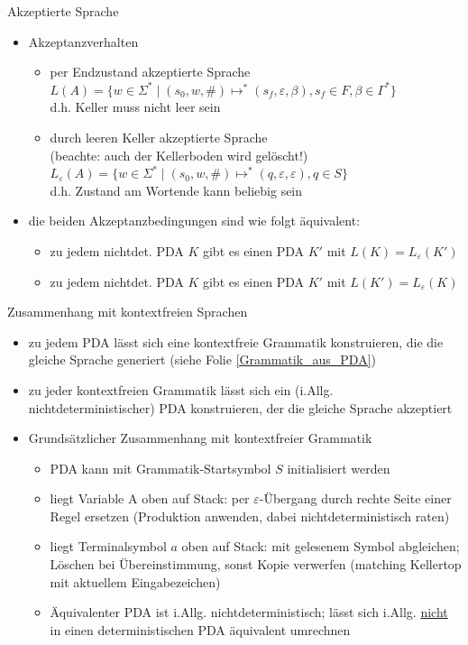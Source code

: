 \begin{frame}{Akzeptierte Sprache}
	\begin{itemize}
		\item Akzeptanzverhalten
		\begin{itemize}
			\item per Endzustand akzeptierte Sprache\\
			$L(A)=\{w \in \Sigma^* \mid (s_0, w, \#) \mapsto^* (s_f, \varepsilon, \beta), s_f \in F, \beta \in \Gamma^*\}$\\
			d.h. Keller muss nicht leer sein
			\item durch leeren Keller akzeptierte Sprache\\
			(beachte: auch der Kellerboden wird gelöscht!)\\
			$L_\varepsilon(A)=\{w \in \Sigma^*\mid (s_0, w, \#) \mapsto^* (q, \varepsilon, \varepsilon), q \in S\}$\\
			d.h. Zustand am Wortende kann beliebig sein
		\end{itemize}
		\item die beiden Akzeptanzbedingungen sind wie folgt äquivalent:
		\begin{itemize}
			\item zu jedem nichtdet. PDA $K$ gibt es einen PDA $K'$ mit $L(K) = L_\varepsilon(K')$
			\item zu jedem nichtdet. PDA $K$ gibt es einen PDA $K'$ mit $L(K') = L_\varepsilon(K)$
		\end{itemize}
	\end{itemize}
\end{frame}

\begin{frame}{Zusammenhang mit kontextfreien Sprachen}
	\begin{itemize}
		\item zu jedem PDA lässt sich eine kontextfreie Grammatik konstruieren, die die gleiche Sprache generiert (siehe Folie \ref{Grammatik_aus_PDA})
		\item zu jeder kontextfreien Grammatik lässt sich ein (i.Allg. nichtdeterministischer) PDA konstruieren, der die gleiche Sprache akzeptiert
		\item Grundsätzlicher Zusammenhang mit kontextfreier Grammatik
		\begin{itemize}
			\item PDA kann mit Grammatik-Startsymbol $S$ initialisiert werden
			\item liegt Variable A oben auf Stack: per $\varepsilon$-Übergang durch rechte Seite einer Regel ersetzen (Produktion anwenden, dabei nichtdeterministisch raten)
			\item liegt Terminalsymbol $a$ oben auf Stack: mit gelesenem Symbol abgleichen; Löschen bei Übereinstimmung, sonst Kopie verwerfen (matching Kellertop mit aktuellem Eingabezeichen)
			\item Äquivalenter PDA ist i.Allg. nichtdeterministisch; lässt sich i.Allg. \underline{nicht} in einen deterministischen PDA äquivalent umrechnen
		\end{itemize}
	\end{itemize}
\end{frame}

